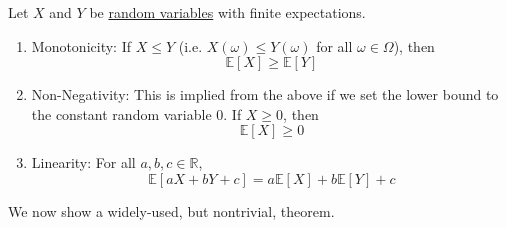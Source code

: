   \begin{lemma}
    \label{thm:properties-of-expectation}
    Let $X$ and $Y$ be \hyperref[def:random-variable]{random variables} with finite expectations. 
    \begin{enumerate}
      \item Monotonicity: If $X \leq Y$ (i.e. $X(\omega) \leq Y(\omega)$ for all $\omega \in \Omega$), then 
      \begin{equation}
        \mathbb{E}[X] \geq \mathbb{E}[Y]
      \end{equation}
      
      \item Non-Negativity: This is implied from the above if we set the lower bound to the constant random variable $0$. If $X \geq 0$, then 
      \begin{equation}
        \mathbb{E}[X] \geq 0
      \end{equation}
      
      \item Linearity: For all $a, b, c \in \mathbb{R}$, 
      \begin{equation}
        \mathbb{E}[a X + b Y + c] = a \mathbb{E}[X] + b \mathbb{E}[Y] + c
      \end{equation}
    \end{enumerate}
  \end{lemma}

  We now show a widely-used, but nontrivial, theorem. 


